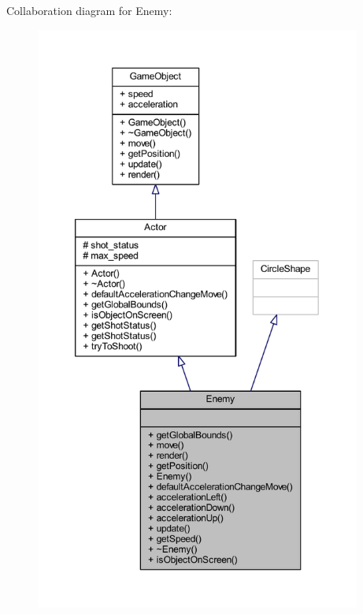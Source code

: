 Collaboration diagram for Enemy\+:
\nopagebreak
\begin{figure}[H]
\begin{center}
\leavevmode
\includegraphics[height=550pt]{class_enemy__coll__graph}
\end{center}
\end{figure}
